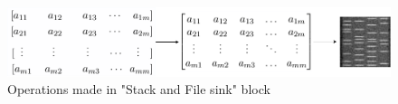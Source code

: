 
\begin{figure}[!htb]
    \centering
    \includegraphics[width=\textwidth]{figures/stack_n_save}
    \caption{Operations made in "Stack and File sink" block}
    \label{fig:stacknsave}
\end{figure}

